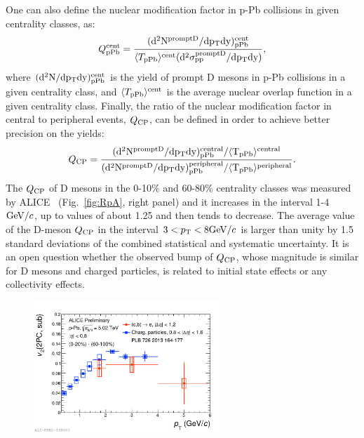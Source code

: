 One can also define the nuclear modification factor in p-Pb collisions in given centrality classes, as:
\begin{equation}
Q_{\rm pPb}^{\rm cent} = \frac{(\rm d^2 N^{\rm prompt D }/\rm d p_{\rm T} \rm d y)^{\rm cent}_{\rm pPb}}{\langle T_{\rm pPb} \rangle ^{\rm cent}(\rm d^2 \sigma^{\rm prompt D }_{pp}/\rm d p_{\rm T} \rm d y)},
\end{equation}
where $(\rm d^2 N/\rm d p_{\rm T} \rm d y)^{\rm cent}_{\rm pPb}$ is the yield of prompt D mesons in p-Pb collisions 
in a given centrality class, and $\langle T_{\rm pPb} \rangle ^{\rm cent}$ is the average nuclear overlap function in a given centrality class.
Finally, the ratio of the nuclear modification factor in central to peripheral events, $Q_{\rm CP}$, 
can be defined in order to achieve better precision on the yields:
\begin{equation}
Q_{\rm CP} = \frac{(\rm d^2 N^{\rm prompt D }/\rm d p_{\rm T} \rm d y)^{\rm central}_{\rm pPb}/ \langle T_{\rm pPb} \rangle^{central}}{(\rm d^2 N^{\rm prompt D }/\rm d p_{\rm T} \rm d y)^{\rm peripheral}_{\rm pPb}/ \langle T_{\rm pPb} \rangle^{peripheral}}.
\label{eq:QCP}
\end{equation}
The $Q_{\rm CP}$ of D mesons in the 0-10\% and 60-80\% centrality classes was measured by 
ALICE~\cite{ALICEPAS2017008} (Fig.~\ref{fig:RpA}, right panel) and it increases in the interval 1-4 $\mathrm{GeV}/c$, 
up to values of about 1.25 and then tends to decrease. The average value of the D-meson $Q_{\rm CP}$ 
in the interval $3 < p_{\rm T} < 8 \mathrm{GeV}/c$ is larger than unity by 1.5 standard deviations of the combined statistical and systematic uncertainty.
It is an open question whether the observed bump of $Q_{\rm CP}$, whose magnitude is similar 
for D mesons and charged particles, is related to initial state effects or any collectivity effects.

\begin{figure}[!ht]
  \centering
  \includegraphics[width=7cm]{FigCap2/v2HFE.pdf}
  \caption{~\cite{Acharya:2017hdv}}
  \label{fig:}
\end{figure}

